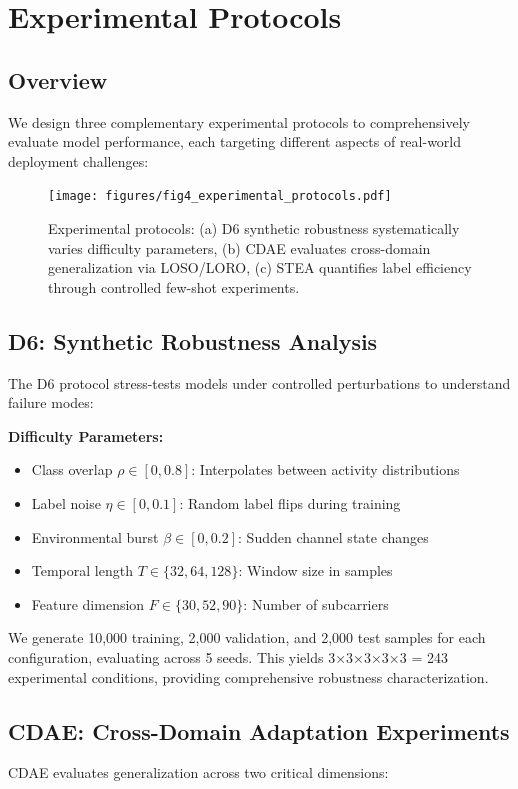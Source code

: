 \documentclass[journal]{IEEEtran}
\begin{document}
\section{Experimental Protocols}

\subsection{Overview}
We design three complementary experimental protocols to comprehensively evaluate model performance, each targeting different aspects of real-world deployment challenges:

\begin{figure}[t]
\centering
\texttt{[image: figures/fig4\_experimental\_protocols.pdf]}
\caption{Experimental protocols: (a) D6 synthetic robustness systematically varies difficulty parameters, (b) CDAE evaluates cross-domain generalization via LOSO/LORO, (c) STEA quantifies label efficiency through controlled few-shot experiments.}
\label{fig:protocols}
\end{figure}

\subsection{D6: Synthetic Robustness Analysis}
The D6 protocol stress-tests models under controlled perturbations to understand failure modes:

\textbf{Difficulty Parameters:}
\begin{itemize}
\item Class overlap $\rho \in [0, 0.8]$: Interpolates between activity distributions
\item Label noise $\eta \in [0, 0.1]$: Random label flips during training
\item Environmental burst $\beta \in [0, 0.2]$: Sudden channel state changes
\item Temporal length $T \in \{32, 64, 128\}$: Window size in samples
\item Feature dimension $F \in \{30, 52, 90\}$: Number of subcarriers
\end{itemize}

We generate 10,000 training, 2,000 validation, and 2,000 test samples for each configuration, evaluating across 5 seeds. This yields 3×3×3×3×3 = 243 experimental conditions, providing comprehensive robustness characterization.

\subsection{CDAE: Cross-Domain Adaptation Experiments}
CDAE evaluates generalization across two critical dimensions:
\end{document}
